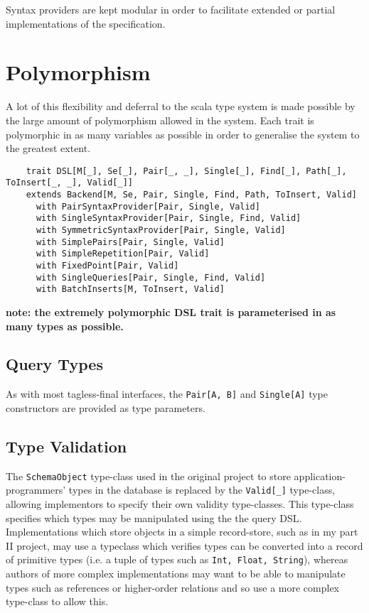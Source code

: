 \documentclass{report}
\newcommand \2[0]{\textbf{2}}
\newcommand \3[0]{\textbf{3}}
\newcommand{\todo}[1]{\textbf{#1}}
\begin{document}
Syntax providers are kept modular in order to facilitate extended or partial implementations of the specification. 


\section{Polymorphism}
A lot of this flexibility and deferral to the scala type system is made possible by the large amount of polymorphism allowed in the system. Each trait is polymorphic in as many variables as possible in order to generalise the system to the greatest extent.


\begin{verbatim}
    trait DSL[M[_], Se[_], Pair[_, _], Single[_], Find[_], Path[_], ToInsert[_, _], Valid[_]]
    extends Backend[M, Se, Pair, Single, Find, Path, ToInsert, Valid]
      with PairSyntaxProvider[Pair, Single, Valid]
      with SingleSyntaxProvider[Pair, Single, Find, Valid]
      with SymmetricSyntaxProvider[Pair, Single, Valid]
      with SimplePairs[Pair, Single, Valid]
      with SimpleRepetition[Pair, Valid]
      with FixedPoint[Pair, Valid]
      with SingleQueries[Pair, Single, Find, Valid]
      with BatchInserts[M, ToInsert, Valid]
\end{verbatim}
\todo{note: the extremely polymorphic DSL trait is parameterised in as many types as possible.}

\subsection{Query Types}
As with most tagless-final interfaces, the \texttt{Pair[A, B]} and \texttt{Single[A]} type constructors are provided as type parameters.
\subsection{Type Validation}
The \texttt{SchemaObject} type-class used in the original project to store application-programmers' types in the database is replaced by the \texttt{Valid[_]} type-class, allowing implementors to specify their own validity type-classes. This type-class specifies which types may be manipulated using the the query DSL. Implementations which store objects in a simple record-store, such as in my part II project, may use a typeclass which verifies types can be converted into a record of primitive types (i.e. a tuple of types such as \texttt{Int, Float, String}), whereas authors of more complex implementations may want to be able to manipulate types such as references or higher-order relations and so use a more complex type-class to allow this.
\end{document}

